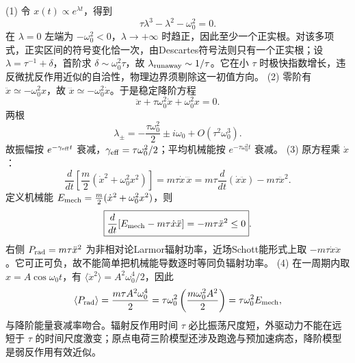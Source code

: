 (1) 令 \(x(t)\propto e^{\lambda t}\)，得到
\[
\tau\lambda^3-\lambda^2-\omega_0^2=0.
\]
在 \(\lambda=0\) 左端为 \(-\omega_0^2<0\)，\(\lambda\to+\infty\) 时趋正，因此至少一个正实根。对该多项式，正实区间的符号变化恰一次，由Descartes符号法则只有一个正实根；设 \(\lambda=\tau^{-1}+\delta\)，首阶求 \(\delta\sim\omega_0^2\tau\)，故 \(\lambda_{\rm runaway}\sim1/\tau\)。它在小 \(\tau\) 时极快指数增长，违反微扰反作用近似的自洽性，物理边界须剔除这一初值方向。
(2) 零阶有 \(\ddot x\simeq-\omega_0^2x\)，故 \(\dddot x\simeq-\omega_0^2\dot x\)。于是稳定降阶方程
\[
\ddot x+\tau\omega_0^2\dot x+\omega_0^2x=0.
\]
两根
\[
\lambda_\pm=-\frac{\tau\omega_0^2}{2}\pm i\omega_0+O(\tau^2\omega_0^3).
\]
故振幅按 \(e^{-\gamma_{\rm eff}t}\) 衰减，\(\gamma_{\rm eff}=\tau\omega_0^2/2\)；平均机械能按 \(e^{-\tau\omega_0^2t}\) 衰减。
(3) 原方程乘 \(\dot x\)：
\[
\frac d{dt}\left[\frac m2(\dot x^2+\omega_0^2x^2)\right]
=m\tau\dot x\,\dddot x
=m\tau\frac d{dt}(\dot x\ddot x)-m\tau\ddot x^2.
\]
定义机械能 \(E_{\rm mech}=\frac m2(\dot x^2+\omega_0^2x^2)\)，则
\[
\boxed{\frac d{dt}[E_{\rm mech}-m\tau\dot x\ddot x]
=-m\tau\ddot x^2\le0}.
\]
右侧 \(P_{\rm rad}=m\tau\ddot x^2\) 为非相对论Larmor辐射功率，近场Schott能形式上取 \(-m\tau\dot x\ddot x\)。它可正可负，故不能简单把机械能导数逐时等同负辐射功率。
(4) 在一周期内取 \(x=A\cos\omega_0t\)，有 \(\langle\ddot x^2\rangle=A^2\omega_0^4/2\)，因此
\[
\langle P_{\rm rad}\rangle=\frac{m\tau A^2\omega_0^4}{2}
=\tau\omega_0^2\left(\frac{m\omega_0^2A^2}{2}\right)
=\tau\omega_0^2E_{\rm mech},
\]
与降阶能量衰减率吻合。辐射反作用时间 \(\tau\) 必比振荡尺度短，外驱动力不能在远短于 \(\tau\) 的时间尺度激变；原点电荷三阶模型还涉及跑逸与预加速病态，降阶模型是弱反作用有效近似。

